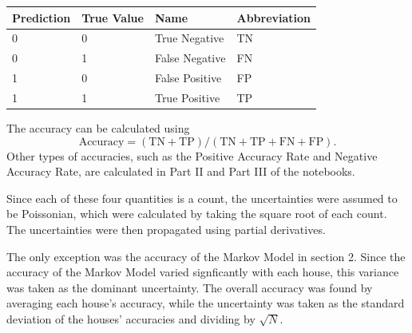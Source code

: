 \documentclass[12pt]{extarticle}
\begin{document}
\begin{center}
\begin{tabular}{ | l | l | l | l | }
	\hline
	Prediction & True Value & Name & Abbreviation \\ \hline
	0 & 0 & True Negative & TN \\ \hline
	0 & 1 & False Negative & FN \\ \hline
	1 & 0 & False Positive & FP \\ \hline
	1 & 1 & True Positive & TP \\
	\hline
\end{tabular}
\end{center}

The accuracy can be calculated using
\begin{equation}
\mbox{Accuracy} = (\mbox{TN} + \mbox{TP}) / (\mbox{TN} + \mbox{TP} + \mbox{FN} + \mbox{FP}).
\end{equation}
Other types of accuracies, such as the Positive Accuracy Rate and Negative Accuracy Rate, are calculated in Part II and Part III of the notebooks.

Since each of these four quantities is a count, the uncertainties were assumed to be Poissonian, which were calculated by taking the square root of each count.
The uncertainties were then propagated using partial derivatives.

The only exception was the accuracy of the Markov Model in section 2.
Since the accuracy of the Markov Model varied signficantly with each house, this variance was taken as the dominant uncertainty.
The overall accuracy was found by averaging each house's accuracy, while the uncertainty was taken as the standard deviation of the houses' accuracies and dividing by $\sqrt{N}$.
\end{document}

